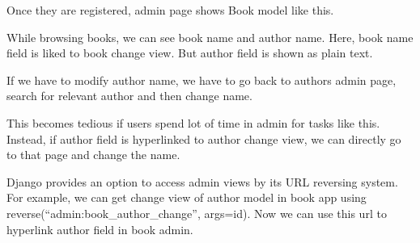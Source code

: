 \documentclass[letterpaper,12pt,english]{sphinxmanual}
\begin{document}
Once they are registered, admin page shows Book model like this.


While browsing books, we can see book name and author name. Here, book name field is liked to book change view. But author field is shown as plain text.

If we have to modify author name, we have to go back to authors admin page, search for relevant author and then change name.

This becomes tedious if users spend lot of time in admin for tasks like this. Instead, if author field is hyperlinked to author change view, we can directly go to that page and change the name.

Django provides an option to access admin views by its URL reversing system. For example, we can get change view of author model in book app using reverse(“admin:book\_author\_change”, args=id). Now we can use this url to hyperlink author field in book admin.

\begin{sphinxVerbatim}[commandchars=\\\{\}]
   
   


 
        

      
           \PYG{p}{[}\PYG{p}{]}
             
         
      
\end{sphinxVerbatim}
\end{document}
